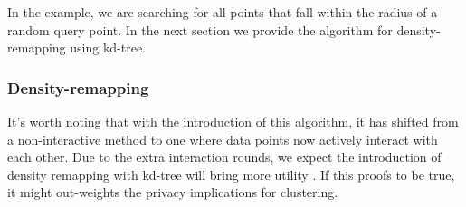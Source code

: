 In the example, we are searching for all points that fall within the radius of a random query point.
In the next section we provide the algorithm for density-remapping using kd-tree.

%

\subsubsection{Density-remapping}


It's worth noting that with the introduction of this algorithm, it has shifted from a non-interactive method to one where data points now actively interact with each other.
Due to the extra interaction rounds, we expect the introduction of density remapping with kd-tree will bring more utility \citep{wang_comprehensive_2020, xiongComprehensiveSurveyLocal2020}.
If this proofs to be true, it might out-weights the privacy implications for clustering. 
%


\newpage

